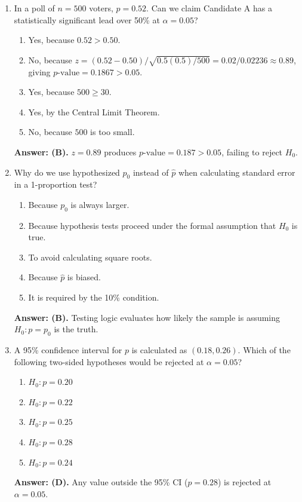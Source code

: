 \begin{enumerate}[resume, leftmargin=1.5em]
  \item In a poll of $n = 500$ voters, $\hat{p} = 0.52$. Can we claim Candidate A has a statistically significant lead over 50\% at $\alpha = 0.05$?
  \begin{enumerate}[label=(\Alph*)]
    \item Yes, because $0.52 > 0.50$.
    \item No, because $z = (0.52-0.50)/\sqrt{0.5(0.5)/500} = 0.02/0.02236 \approx 0.89$, giving $p\text{-value} = 0.1867 > 0.05$.
    \item Yes, because $500 \ge 30$.
    \item Yes, by the Central Limit Theorem.
    \item No, because $500$ is too small.
  \end{enumerate}
  \textbf{Answer: (B).} $z = 0.89$ produces $p\text{-value} = 0.187 > 0.05$, failing to reject $H_0$.

  \item Why do we use hypothesized $p_0$ instead of $\hat{p}$ when calculating standard error in a 1-proportion test?
  \begin{enumerate}[label=(\Alph*)]
    \item Because $p_0$ is always larger.
    \item Because hypothesis tests proceed under the formal assumption that $H_0$ is true.
    \item To avoid calculating square roots.
    \item Because $\hat{p}$ is biased.
    \item It is required by the 10\% condition.
  \end{enumerate}
  \textbf{Answer: (B).} Testing logic evaluates how likely the sample is assuming $H_0: p = p_0$ is the truth.

  \item A 95\% confidence interval for $p$ is calculated as $(0.18, 0.26)$. Which of the following two-sided hypotheses would be rejected at $\alpha = 0.05$?
  \begin{enumerate}[label=(\Alph*)]
    \item $H_0: p = 0.20$ \item $H_0: p = 0.22$ \item $H_0: p = 0.25$ \item $H_0: p = 0.28$ \item $H_0: p = 0.24$
  \end{enumerate}
  \textbf{Answer: (D).} Any value outside the 95\% CI ($p = 0.28$) is rejected at $\alpha = 0.05$.


\end{enumerate}
